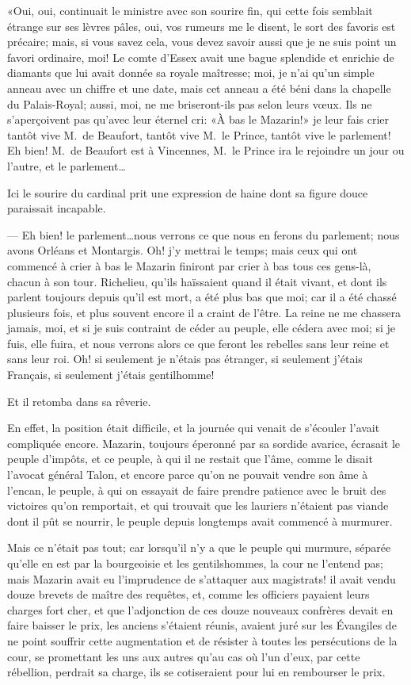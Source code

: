 «Oui, oui, continuait le ministre avec son sourire fin, qui cette fois semblait étrange sur ses lèvres pâles, oui, vos rumeurs me le disent, le sort des favoris est précaire; mais, si vous savez cela, vous devez savoir aussi que je ne suis point un favori ordinaire, moi! Le comte d'Essex avait une bague splendide et enrichie de diamants que lui avait donnée sa royale maîtresse; moi, je n'ai qu'un simple anneau avec un chiffre et une date, mais cet anneau a été béni dans la chapelle du Palais-Royal; aussi, moi, ne me briseront-ils pas selon leurs vœux. Ils ne s'aperçoivent pas qu'avec leur éternel cri: «À bas le Mazarin!» je leur fais crier tantôt vive M.~de Beaufort, tantôt vive M.~le Prince, tantôt vive le parlement! Eh bien! M.~de Beaufort est à Vincennes, M.~le Prince ira le rejoindre un jour ou l'autre, et le parlement\dots

Ici le sourire du cardinal prit une expression de haine dont sa figure douce paraissait incapable.

— Eh bien! le parlement\dots nous verrons ce que nous en ferons du parlement; nous avons Orléans et Montargis. Oh! j'y mettrai le temps; mais ceux qui ont commencé à crier à bas le Mazarin finiront par crier à bas tous ces gens-là, chacun à son tour. Richelieu, qu'ils haïssaient quand il était vivant, et dont ils parlent toujours depuis qu'il est mort, a été plus bas que moi; car il a été chassé plusieurs fois, et plus souvent encore il a craint de l'être. La reine ne me chassera jamais, moi, et si je suis contraint de céder au peuple, elle cédera avec moi; si je fuis, elle fuira, et nous verrons alors ce que feront les rebelles sans leur reine et sans leur roi. Oh! si seulement je n'étais pas étranger, si seulement j'étais Français, si seulement j'étais gentilhomme!

Et il retomba dans sa rêverie.

En effet, la position était difficile, et la journée qui venait de s'écouler l'avait compliquée encore. Mazarin, toujours éperonné par sa sordide avarice, écrasait le peuple d'impôts, et ce peuple, à qui il ne restait que l'âme, comme le disait l'avocat général Talon, et encore parce qu'on ne pouvait vendre son âme à l'encan, le peuple, à qui on essayait de faire prendre patience avec le bruit des victoires qu'on remportait, et qui trouvait que les lauriers n'étaient pas viande dont il pût se nourrir, le peuple depuis longtemps avait commencé à murmurer.

Mais ce n'était pas tout; car lorsqu'il n'y a que le peuple qui murmure, séparée qu'elle en est par la bourgeoisie et les gentilshommes, la cour ne l'entend pas; mais Mazarin avait eu l'imprudence de s'attaquer aux magistrats! il avait vendu douze brevets de maître des requêtes, et, comme les officiers payaient leurs charges fort cher, et que l'adjonction de ces douze nouveaux confrères devait en faire baisser le prix, les anciens s'étaient réunis, avaient juré sur les Évangiles de ne point souffrir cette augmentation et de résister à toutes les persécutions de la cour, se promettant les uns aux autres qu'au cas où l'un d'eux, par cette rébellion, perdrait sa charge, ils se cotiseraient pour lui en rembourser le prix.


